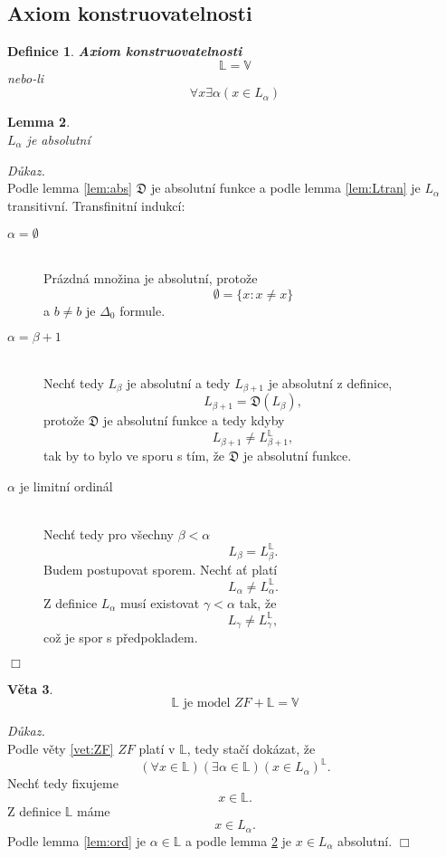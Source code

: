 \documentclass[12pt,a4paper]{article}
\newtheorem{veta}{V\v{e}ta}[section]%
\newtheorem{lemma}[veta]{Lemma}
\newtheorem{definice}[veta]{Definice}
\newenvironment{proof}
{\noindent \textit{D\r{u}kaz.}}
{\hspace*{\fill} $\Box$}
\begin{document}
\subsection{Axiom konstruovatelnosti}
\begin{definice}\textbf{Axiom konstruovatelnosti}
\[ \mathbb{L}=\mathbb{V} \]
nebo-li
\[ \forall x \exists \alpha (x \in L_\alpha)
 \]
\end{definice}
\begin{lemma}~\\
\label{lem:L}
$ L_\alpha $ je absolutn\'{i}
\end{lemma}
\begin{proof}~\\
Podle lemma \ref{lem:abs} $ \mathfrak{D} $ je absolutn\'{i} funkce a podle lemma \ref{lem:Ltran} je $ L_\alpha $ transitivn\'{i}.
Transfinitn\'{i} indukc\'{i}:
\begin{description}
  \item[$ \alpha=\emptyset $] ~\\
  Pr\'{a}zdn\'{a} mno\v{z}ina je absolutn\'{i}, proto\v{z}e 
\[ \emptyset=\{x:x \neq x \} \]
a  $ b  \neq  b $  je $\Delta_0$ formule.
  \item[$ \alpha=\beta +1 $]~\\
  Nech\v{t} tedy $ L_\beta $ je absolutn\'{i}  a tedy $ L_{\beta+1} $ je absolutn\'{i} z definice, 
 \[ L_{\beta+1}=\mathfrak{D}(L_\beta) ,\]
proto\v{z}e $ \mathfrak{D} $ je absolutn\'{i} funkce a tedy kdyby 
\[  L_{\beta+1}  \neq  L_{\beta+1}^\mathbb{L} , \]
tak by to bylo ve sporu s t\'{i}m, \v{z}e $ \mathfrak{D} $ je absolutn\'{i} funkce.
  \item[$ \alpha $ je limitn\'{i} ordin\'{a}l]~\\
  Nech\v{t} tedy pro v\v{s}echny $ \beta < \alpha $ 
\[  L_{\beta}  =  L_{\beta}^\mathbb{L}  .\]
Budem postupovat sporem. Nech\v{t} a\v{t} plat\'{i}
\[  L_{\alpha} \neq L_{\alpha}^\mathbb{L}  .\]
Z definice $ L_\alpha $  mus\'{i} existovat $\gamma < \alpha $ tak, \v{z}e 
\[  L_{\gamma}  \neq  L_{\gamma}^\mathbb{L},  \]
co\v{z} je spor s p\v{r}edpokladem.
\end{description}
\end{proof}
\newpage
\begin{veta}
\[ \mathbb{L}  \text{ je model } ZF +\mathbb{L}=\mathbb{V} \] 
\end{veta}
\begin{proof}~\\
Podle v\v{e}ty \ref{vet:ZF} $ ZF $ plat\'{i} v $\mathbb{L}$, tedy sta\v{c}\'{i} dok\'{a}zat, \v{z}e
\[ (\forall x \in \mathbb{L}) (\exists \alpha \in \mathbb{L})  (x \in L_\alpha)^\mathbb{L}.\]
Nech\v{t} tedy fixujeme  \[ x \in \mathbb{L} . \] Z definice $ \mathbb{L} $ m\'{a}me \[ x \in L_\alpha . \]  Podle lemma \ref{lem:ord} je $ \alpha \in \mathbb{L} $ a podle lemma \ref{lem:L} je $ x \in L_\alpha $ absolutn\'{i}.
\end{proof}
\newpage
\end{document}
